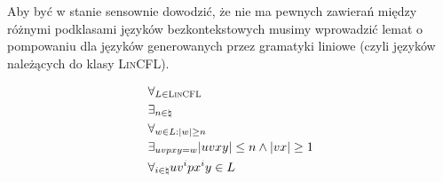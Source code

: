 Aby być w stanie sensownie dowodzić, że nie ma pewnych zawierań między różnymi podklasami języków bezkontekstowych musimy wprowadzić lemat o pompowaniu dla języków generowanych przez gramatyki liniowe (czyli języków należących do klasy \textsc{LinCFL}).

\begin{theorem}
    \large
    \[ 
    \begin{split}
        &\forall_{L \in \textsc{LinCFL}}  \\
        &\exists_{n \in \natural} \\
        &\forall_{w \in L : |w| \geq n} \\
        &\exists_{uvpxy = w} |uvxy| \leq n \land |vx| \geq 1 \\
        &\forall_{i \in \natural} uv^ipx^iy \in L
    \end{split}
     \]
        
\end{theorem}


